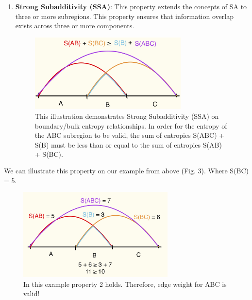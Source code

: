 \documentclass[12pt]{article}
\begin{document}
\begin{enumerate}
    \item \textbf{Strong Subadditivity (SSA)}: This property extends the concepts of SA to three or more subregions. This property ensures that information overlap exists across three or more components.
    \begin{figure}[htbp]  %
        \centering
        \includegraphics[width=0.75\textwidth,height=0.23\textheight]{SSA.jpeg}  %
        \caption{This illustration demonstrates Strong Subadditivity (SSA) on boundary/bulk entropy relationships. In order for the entropy of the ABC subregion to be valid, the sum of entropies S(ABC) + S(B) must be less than or equal to the sum of entropies S(AB) + S(BC).}  %
        \label{fig:SSA}  %
    \end{figure}
\end{enumerate}
We can illustrate this property on our example from above (Fig. 3). Where S(BC) = 5.
\begin{figure}[htbp]  %
    \centering
    \includegraphics[width=0.7\textwidth,height=0.25\textheight]{ssa_ex.jpeg}  %
    \caption{In this example property 2 holds. Therefore, edge weight for ABC is valid!}  %
    \label{fig:SSA_ex}  %
\end{figure}


\newpage
\end{document}
